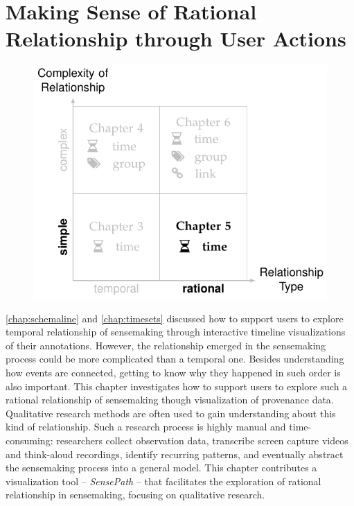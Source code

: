 \chapter{Making Sense of Rational Relationship through User Actions}
\label{chap:sensepath}

\graphicspath{{Chapter5/figures/}}

\begin{figure}[!htb]
	\centering
	\includegraphics{work}
\end{figure}

\vspace{.8in}


\pagebreak

\autoref{chap:schemaline} and \autoref{chap:timesets} discussed how to support users to explore temporal relationship of sensemaking through interactive timeline visualizations of their annotations. However, the relationship emerged in the sensemaking process could be more complicated than a temporal one. Besides understanding how events are connected, getting to know why they happened in such order is also important. This chapter investigates how to support users to explore such a rational relationship of sensemaking though visualization of provenance data. Qualitative research methods are often used to gain understanding about this kind of relationship. Such a research process is highly manual and time-consuming: researchers collect observation data, transcribe screen capture videos and think-aloud recordings, identify recurring patterns, and eventually abstract the sensemaking process into a general model. This chapter contributes a visualization tool -- \emph{SensePath} -- that facilitates the exploration of rational relationship in sensemaking, focusing on qualitative research.

